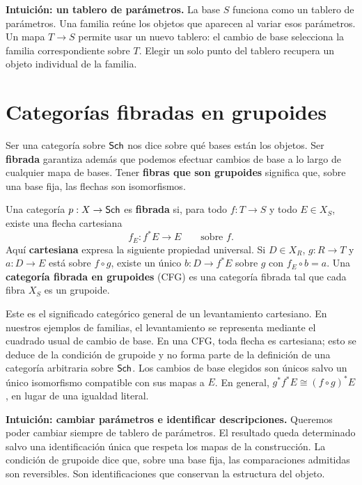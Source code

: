 \documentclass[12pt,openany]{memoir}
\begin{document}
\begin{ptcb}
\textbf{Intuición: un tablero de parámetros.}
La base \(S\) funciona como un tablero de parámetros. Una familia reúne
los objetos que aparecen al variar esos parámetros. Un mapa \(T\to S\)
permite usar un nuevo tablero: el cambio de base selecciona la familia
correspondiente sobre \(T\). Elegir un solo punto del tablero recupera
un objeto individual de la familia.
\end{ptcb}

\section{Categorías fibradas en grupoides}
\label{sec:cfg}

\begin{ptcb}
Ser una categoría sobre \(\mathsf{Sch}\) nos dice sobre qué bases están los
objetos. Ser \textbf{fibrada} garantiza además que podemos efectuar cambios
de base a lo largo de cualquier mapa de bases. Tener \textbf{fibras que son
grupoides} significa que, sobre una base fija, las flechas son isomorfismos.
\end{ptcb}

\begin{Def}
Una categoría \(p:X\to\mathsf{Sch}\) es \textbf{fibrada} si, para todo
\(f:T\to S\) y todo \(E\in X_S\), existe una flecha cartesiana
\[
 f_E:f^*E\longrightarrow E
 \qquad\text{sobre }f.
\]
Aquí \textbf{cartesiana} expresa la siguiente propiedad universal.
Si \(D\in X_R\), \(g:R\to T\) y \(a:D\to E\) está sobre
\(f\circ g\), existe un único \(b:D\to f^*E\) sobre \(g\) con
\(f_E\circ b=a\). Una \textbf{categoría fibrada en grupoides} (CFG) es
una categoría fibrada tal que cada fibra \(X_S\) es un grupoide.
\end{Def}

Este es el significado categórico general de un levantamiento cartesiano.
En nuestros ejemplos de familias, el levantamiento se representa mediante
el cuadrado usual de cambio de base. En una CFG, toda flecha es cartesiana;
esto se deduce de la condición de grupoide y no forma parte de la
definición de una categoría arbitraria sobre \(\mathsf{Sch}\).
Los cambios de base elegidos son únicos salvo un único isomorfismo
compatible con sus mapas a \(E\). En general,
\(g^*f^*E\cong(f\circ g)^*E\), en lugar de una igualdad literal.

\begin{ptcb}
\textbf{Intuición: cambiar parámetros e identificar descripciones.}
Queremos poder cambiar siempre de tablero de parámetros. El resultado queda
determinado salvo una identificación única que respeta los mapas de la
construcción. La condición de grupoide dice que, sobre una base fija, las
comparaciones admitidas son reversibles. Son identificaciones que conservan
la estructura del objeto.
\end{ptcb}
\end{document}
